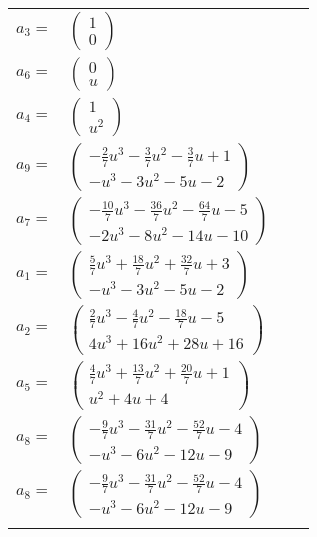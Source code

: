\documentclass[1p]{elsarticle_modified}
\theoremstyle{definition}
\begin{document}
\begin{tabular}{m{7pt} m{180pt} m{7pt} m{180pt} }
\flushright $a_{3}=$&$\begin{pmatrix}1\\0\end{pmatrix}$ \\
\flushright $a_{6}=$&$\begin{pmatrix}0\\u\end{pmatrix}$ \\
\flushright $a_{4}=$&$\begin{pmatrix}1\\u^2\end{pmatrix}$ \\
\flushright $a_{9}=$&$\begin{pmatrix}-\frac{2}{7} u^3-\frac{3}{7} u^2-\frac{3}{7} u+1\\- u^3-3 u^2-5 u-2\end{pmatrix}$ \\
\flushright $a_{7}=$&$\begin{pmatrix}-\frac{10}{7} u^3-\frac{36}{7} u^2-\frac{64}{7} u-5\\-2 u^3-8 u^2-14 u-10\end{pmatrix}$ \\
\flushright $a_{1}=$&$\begin{pmatrix}\frac{5}{7} u^3+\frac{18}{7} u^2+\frac{32}{7} u+3\\- u^3-3 u^2-5 u-2\end{pmatrix}$ \\
\flushright $a_{2}=$&$\begin{pmatrix}\frac{2}{7} u^3-\frac{4}{7} u^2-\frac{18}{7} u-5\\4 u^3+16 u^2+28 u+16\end{pmatrix}$ \\
\flushright $a_{5}=$&$\begin{pmatrix}\frac{4}{7} u^3+\frac{13}{7} u^2+\frac{20}{7} u+1\\u^2+4 u+4\end{pmatrix}$ \\
\flushright $a_{8}=$&$\begin{pmatrix}-\frac{9}{7} u^3-\frac{31}{7} u^2-\frac{52}{7} u-4\\- u^3-6 u^2-12 u-9\end{pmatrix}$\\ \flushright $a_{8}=$&$\begin{pmatrix}-\frac{9}{7} u^3-\frac{31}{7} u^2-\frac{52}{7} u-4\\- u^3-6 u^2-12 u-9\end{pmatrix}$\\&\end{tabular}
\end{document}
